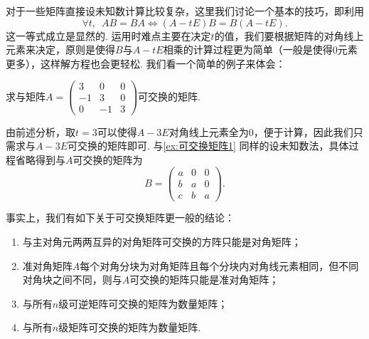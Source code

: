 对于一些矩阵直接设未知数计算比较复杂，这里我们讨论一个基本的技巧，即利用
\[\forall t,\enspace AB=BA \iff (A-tE)B=B(A-tE).\]
这一等式成立是显然的. 运用时难点主要在决定$t$的值，我们要根据矩阵的对角线上元素来决定，原则是使得$B$与$A-tE$相乘的计算过程更为简单（一般是使得0元素更多），这样解方程也会更轻松. 我们看一个简单的例子来体会：
\begin{example}{}{}
    求与矩阵$A=\begin{pmatrix}
            3  & 0  & 0 \\
            -1 & 3  & 0 \\
            0  & -1 & 3
        \end{pmatrix}$可交换的矩阵.
\end{example}

\begin{solution}
    由前述分析，取$t=3$可以使得$A-3E$对角线上元素全为0，便于计算，因此我们只需求与$A-3E$可交换的矩阵即可. 与\autoref{ex:可交换矩阵1} 同样的设未知数法，具体过程省略得到与$A$可交换的矩阵为
    \[B=\begin{pmatrix}
            a & 0 & 0 \\
            b & a & 0 \\
            c & b & a
        \end{pmatrix}.\]
\end{solution}

事实上，我们有如下关于可交换矩阵更一般的结论：
\begin{theorem}{}{}
    \begin{enumerate}
        \item 与主对角元两两互异的对角矩阵可交换的方阵只能是对角矩阵；

        \item 准对角矩阵$A$每个对角分块为对角矩阵且每个分块内对角线元素相同，但不同对角块之间不同，则与$A$可交换的矩阵只能是准对角矩阵；

        \item 与所有$n$级可逆矩阵可交换的矩阵为数量矩阵；

        \item 与所有$n$级矩阵可交换的矩阵为数量矩阵.
    \end{enumerate}
\end{theorem}


